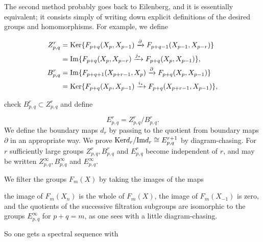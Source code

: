 \documentclass[../main]{subfiles}
\begin{document}
The second method probably goes back to Eilenberg, and it is essentially equivalent; it consists simply of writing down explicit definitions of the desired groups and homomorphisms. For example, we define


\begin{align*}
    Z_{p,q}^r&=\mathrm{Ker}\{F_{p+q}(X_p,X_{p-1})\xrightarrow{\partial}F_{p+q-1}(X_{p-1},X_{p-r})\}\\
    &=\mathrm{Im}\{F_{p+q}(X_p,X_{p-r})\xrightarrow{j_{\ast}}F_{p+q}(X_p,X_{p-1})\},\\
    B_{p,q}^r&=\mathrm{Im}\{F_{p+q+1}(X_{p+r-1},X_p)\xrightarrow{\partial}F_{p+q}(X_p,X_{p-1})\}\\
    &=\mathrm{Ker}\{F_{p+q}(X_p,X_{p-1})\xrightarrow{i_{\ast}}F_{p+q}(X_{p+r-1},X_{p-1})\},
\end{align*}

check $B_{p,q}^r\subset Z_{p,q}^r$ and define

\begin{equation*}
    E_{p,q}^r=Z_{p,q}^r/B_{p,q}^r.
\end{equation*}
We define the boundary maps $d_r$ by passing to the quotient from boundary maps $\partial$ in an appropriate way. We prove $\mathrm{Ker}d_r/\mathrm{Im}d_r\cong E_{p,q}^{r+1}$ by diagram-chasing. For $r$ sufficiently large groups $Z_{p,q}^r,B_{p,q}^r$ and $E_{p,q}^r$ become independent of $r$, and may be written $Z_{p,q}^{\infty},B_{p,q}^{\infty}$ and $E_{p,q}^{\infty}$.

We filter the groups $F_m(X)$ by taking the images of the maps
\begin{center}
\end{center}

the image of $F_m(X_n)$ is the whole of $F_m(X)$, the image of $F_m(X_{-1})$ is zero, and the quotients of the successive filtration subgroups are isomorphic to the groups $E_{p,q}^{\infty}$ for $p+q=m$, as one sees with a little diagram-chasing.

So one gets a spectral sequence with 

\begin{center}
\end{center}
\end{document}
